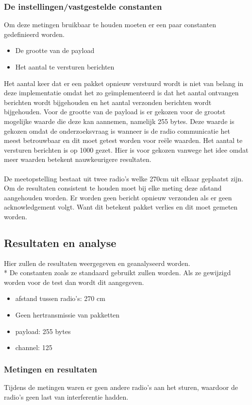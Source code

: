 \documentclass{article}
\begin{document}
\subsubsection{De instellingen/vastgestelde constanten}
Om deze metingen bruikbaar te houden moeten er een paar constanten gedefinieerd worden.
\begin{itemize}
	\item De grootte van de payload
	\item Het aantal te versturen berichten
\end{itemize}
Het aantal keer dat er een pakket opnieuw verstuurd wordt is niet van belang in deze implementatie omdat het zo ge\"{i}mplementeerd is dat het aantal ontvangen berichten wordt bijgehouden en het aantal verzonden berichten wordt bijgehouden. 
Voor de grootte van de payload is er gekozen voor de grootst mogelijke waarde die deze kan aannemen, namelijk 255 bytes. Deze waarde is gekozen omdat de onderzoeksvraag is wanneer is de radio communicatie het meest betrouwbaar en dit moet getest worden voor re\"{e}le waarden. 
Het aantal te versturen berichten is op 1000 gezet. Hier is voor gekozen vanwege het idee omdat meer waarden betekent nauwkeurigere resultaten.
\\
\\
De meetopstelling bestaat uit twee radio's welke 270cm uit elkaar geplaatst zijn. Om de resultaten consistent te houden moet bij elke meting deze afstand aangehouden worden. 
Er worden geen bericht opnieuw verzonden als er geen acknowledgement volgt. Want dit betekent pakket verlies en dit moet gemeten worden. 

\subsection{Resultaten en analyse}
Hier zullen de resultaten weergegeven en geanalyseerd worden. \\*
  De constanten zoals ze standaard gebruikt zullen worden. Als ze gewijzigd worden voor de test dan wordt dit aangegeven. 
  \begin{itemize}
  	\item afstand tussen radio's: 270 cm
  	\item Geen hertransmissie van pakketten
  	\item payload: 255 bytes
  	\item channel: 125
  \end{itemize}
  
\subsubsection{Metingen en resultaten}
Tijdens de metingen waren er geen andere radio's aan het sturen, waardoor de radio's geen last van interferentie hadden.\\
\end{document}

